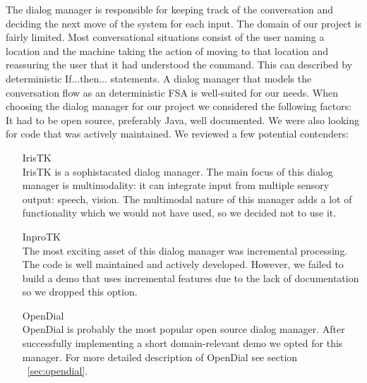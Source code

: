 The dialog manager is responsible for keeping track of the conversation and deciding the next move of the system for each input. The domain of our project is fairly limited. Most conversational situations consist of the user naming a location and the machine taking the action of moving to that location and reassuring the user that it had understood the command. This can described by deterministic If...then... statements. A dialog manager that models the conversation flow as an deterministic FSA is well-suited for our needs.
When choosing the dialog manager for our project we considered the following factors: It had to be open source, preferably Java, well documented.
We were also looking for code that was actively maintained.
We reviewed a few potential contenders:
\begin{itemize}
\item[IrisTK] \hfill \\
IrisTK is a sophistacated dialog manager. The main focus of this dialog manager is multimodality: it can integrate input from multiple sensory output: speech, vision. The multimodal nature of this manager adds a lot of functionality which we would not have used, so we decided not to use it.
\item[InproTK] \hfill \\
The most exciting asset of this dialog manager was incremental processing.
The code is well maintained and actively developed. 
However, we failed to build a demo that uses incremental features due to the lack of documentation so we dropped this option.
\item[OpenDial] \hfill \\
OpenDial is probably the most popular open source dialog manager.
After successfully implementing a short domain-relevant demo we opted for this manager.
For more detailed description of OpenDial see section ~\ref{sec:opendial}.

\end{itemize}